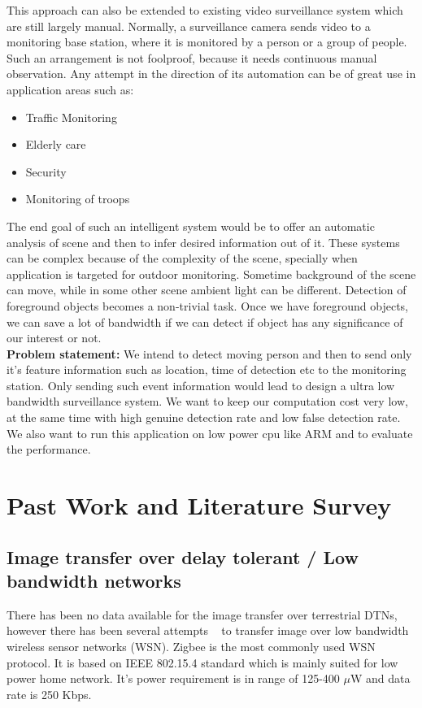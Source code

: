 \indent This approach can also be extended to existing video
surveillance system which are still largely manual.  Normally, a
surveillance camera sends video to a monitoring base station, where it
is monitored by a person or a group of people. Such an arrangement is
not foolproof, because it needs continuous manual observation.  Any
attempt in the direction of its automation can be of great use in
application areas such as:\\
\begin{itemize}
	 \item  Traffic Monitoring
	  \item Elderly care
	    \item Security
	    \item Monitoring of troops
\end{itemize}
\indent The end goal of such an intelligent system would be to offer an
automatic analysis of scene and then to infer desired information out of
it. These systems can be complex because of the complexity of the scene,
specially when application is targeted for outdoor monitoring.  Sometime
background of the scene can move, while in some other scene ambient
light can be different. Detection of foreground objects becomes a
non-trivial task.  Once we have foreground objects, we can save a lot of
bandwidth if we can detect if object has any significance of our
interest or not.\\
\textbf{Problem statement:} We intend to detect moving person and then
to send only it's feature information such as location, time of
detection etc to the monitoring station. Only sending such event
information would lead to design a ultra low bandwidth surveillance
system.  We want to keep our computation cost very low, at the same time
with high genuine detection rate and low false detection rate. We also
want to run this application on low power cpu like ARM and to evaluate
the performance.
\section{Past Work and Literature Survey}
\subsection{Image transfer over delay tolerant / Low bandwidth networks}

\indent There has been no data available for the image transfer over
terrestrial DTNs, however there has been several attempts ~\cite{2, 3,
4, 5} to transfer image over low bandwidth wireless sensor networks
(WSN). Zigbee is the most commonly used WSN protocol. It is based on IEEE
802.15.4 standard which is mainly suited for low power home network. It's power
requirement is in range of 125-400 $\mu$W and data rate is 250 Kbps.\\

